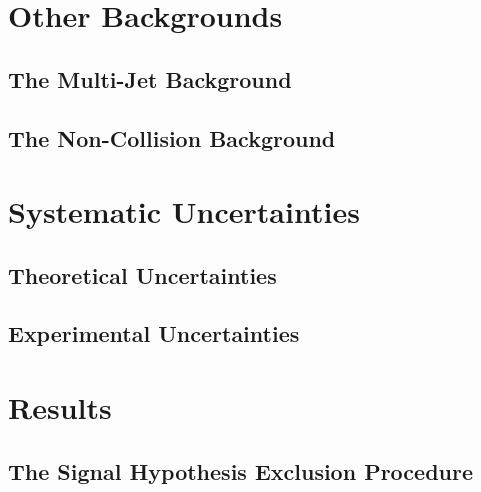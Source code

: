 \documentclass[10pt,twoside,cucitura,classica,english,openany]{toptesi}
\begin{document}


\section{Other Backgrounds}
\label{sec:other-backgrounds}

\subsection{The Multi-Jet Background}
\label{sec:multi-jet-background}



\subsection{The Non-Collision Background}
\label{sec:non-coll-backgr}



\section{Systematic Uncertainties}
\label{sec:syst-uncert}



\subsection{Theoretical Uncertainties}
\label{sec:theor-uncert}



\subsection{Experimental Uncertainties}
\label{sec:exper-uncert}



\section{Results}
\label{sec:results}



\subsection{The Signal Hypothesis Exclusion Procedure}
\label{sec:sign-hypoth-excl}
\end{document}
